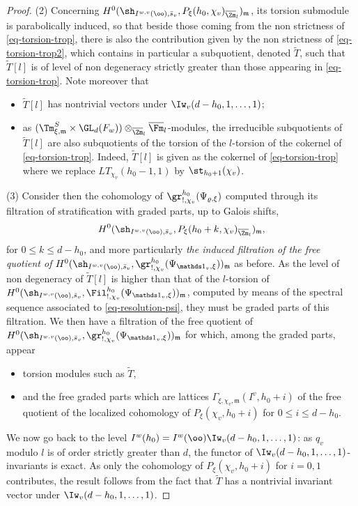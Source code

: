 \begin{proof}
(2) Concerning $H^0(\sh_{I^{w,v}(\oo),\bar s_v},
P_\xi(h_0,\chi_v)_{\overline \Zm_l})_{\mathfrak m}$,
its torsion submodule is
parabolically induced, so that beside those coming from the non strictness of \eqref{eq-torsion-trop},
there is also the contribution given by the non strictness of \eqref{eq-torsion-trop2}, which
contains in particular a subquotient, denoted $\widetilde T$,
such that $\widetilde T[l]$ is of level of non degeneracy strictly greater than those appearing
in \eqref{eq-torsion-trop}. Note moreover that
\begin{itemize}
\item $\widetilde T[l]$ has nontrivial vectors under $\Iw_v(d-h_0,1,\dots,1)$;

\item as $(\Tm^S_{\xi,\mathfrak m} \times \GL_d(F_w)) \otimes_{\overline \Zm_l} \overline \Fm_l$-modules, the irreducible subquotients of
$\widetilde T[l]$ are also subquotients of the torsion of the $l$-torsion of the
cokernel of \eqref{eq-torsion-trop}. Indeed, $\widetilde T[l]$ is given as the cokernel
of \eqref{eq-torsion-trop} where we replace $LT_{\chi_v}(h_0-1,1)$ by
$\st_{h_0+1}(\chi_v)$.
\end{itemize}

(3) Consider then the cohomology of $\gr^{h_0}_{!,\chi_v}(\Psi_{\varrho,\xi})$
computed through
its filtration of stratification with graded parts, up to Galois shifts,
\[
H^0(\sh_{I^{w,v}(\oo),\bar s_v},P_\xi(h_0+k,\chi_v)_{\overline \Zm_l})_{\mathfrak m},
\]
for $0 \leq k \leq d-h_0$,
and more particularly \emph{the induced filtration of the free quotient of}
$H^0(\sh_{I^{w,v}(\oo),\bar s_v},\gr^{h_0}_{!,\chi_v}(\Psi_{\mathds 1_v,\xi}))_{\mathfrak m}$ as before.
As the level of non degeneracy of $\widetilde T[l]$ is higher than that of the $l$-torsion
of $H^0(\sh_{I^{w,v}(\oo),\bar s_v},\Fil^{h_0}_{!,\chi_v}
(\Psi_{\mathds 1_v,\xi}))_{\mathfrak m}$,
computed by means of the spectral sequence associated to \eqref{eq-resolution-psi},
they must be graded parts of this filtration.
We then have a filtration of the free quotient of $H^0(\sh_{I^{w,v}(\oo),\bar s_v},
\gr^{h_0}_{!,\chi_v}(\Psi_{\mathds 1_v,\xi}))_{\mathfrak m}$ for which, among the graded parts, appear
\begin{itemize}
\item torsion modules such as $\widetilde T$,

\item and the free graded parts which are lattices
$\Gamma_{\xi,\chi_v,\mathfrak m}(I^v,h_0+i)$
of the free quotient of the localized cohomology of $P_\xi(\chi_v,h_0+i)$
for $0 \leq i \leq d-h_0$.
\end{itemize}
We now go back to the level $I^w(h_0)=I^w(\oo)\Iw_v(d-h_0,1,\dots,1)$:
as $q_v$ modulo $l$ is of order strictly
greater than $d$, the functor of $\Iw_v(d-h_0,1,\dots,1)$-invariants
is exact. As only the
cohomology of $P_\xi(\chi_v,h_0+i)$ for $i=0,1$ contributes, the result follows from
the fact that $\widetilde T$ has a nontrivial invariant vector under $\Iw_v(d-h_0,1,\dots,1)$.
\end{proof}

